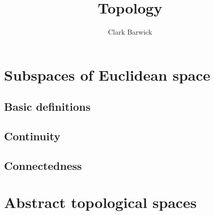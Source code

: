 \documentclass[a4paper,nobib,nols]{tufte-book}
\title{Topology}
\author{Clark Barwick}
\begin{document}
\maketitle

\setcounter{tocdepth}{2}
\tableofcontents

\bigskip

\chapter{Subspaces of Euclidean space}%
\label{cha:subspaces_of_euclidean_space}

\section{Basic definitions}%
\label{sec:basic_definitions}



\section{Continuity}%
\label{sec:continuity_for_subspaces_of_euclidean_space}



\section{Connectedness}%
\label{sec:connectedness_for_subspaces_of_euclidean_space}



\chapter{Abstract topological spaces}%
\label{cha:abstract_topological_spaces}
\end{document}
